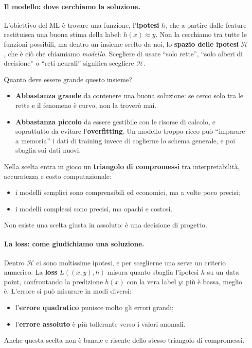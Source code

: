 \paragraph*{Il modello: dove cerchiamo la soluzione.}
L'obiettivo del ML è trovare una funzione, l'\textbf{ipotesi} $h$, che a partire dalle feature restituisca una buona stima della label: $h(x) \approx y$. Non la cerchiamo tra tutte le funzioni possibili, ma dentro un insieme scelto da noi, lo \textbf{spazio delle ipotesi} $\mathcal{H}$, che è ciò che chiamiamo \emph{modello}. Scegliere di usare ``solo rette'', ``solo alberi di decisione'' o ``reti neurali'' significa scegliere $\mathcal{H}$.

Quanto deve essere grande questo insieme?
\begin{itemize}
    \item \textbf{Abbastanza grande} da contenere una buona soluzione: se cerco solo tra le rette e il fenomeno è curvo, non la troverò mai.
    \item \textbf{Abbastanza piccolo} da essere gestibile con le risorse di calcolo, e soprattutto da evitare l'\textbf{overfitting}. Un modello troppo ricco può ``imparare a memoria'' i dati di training invece di coglierne lo schema generale, e poi sbaglia sui dati nuovi.
\end{itemize}
Nella scelta entra in gioco un \textbf{triangolo di compromessi} tra interpretabilità, accuratezza e costo computazionale:
\begin{itemize}
    \item i modelli semplici sono comprensibili ed economici, ma a volte poco precisi;
    \item i modelli complessi sono precisi, ma opachi e costosi.
\end{itemize}
Non esiste una scelta giusta in assoluto: è una decisione di progetto.

\paragraph*{La loss: come giudichiamo una soluzione.}
Dentro $\mathcal{H}$ ci sono moltissime ipotesi, e per sceglierne una serve un criterio numerico. La \textbf{loss} $L((x,y),h)$ misura quanto sbaglia l'ipotesi $h$ su un data point, confrontando la predizione $h(x)$ con la vera label $y$: più è bassa, meglio è. L'errore si può misurare in modi diversi:
\begin{itemize}
    \item l'\textbf{errore quadratico} punisce molto gli errori grandi;
    \item l'\textbf{errore assoluto} è più tollerante verso i valori anomali.
\end{itemize}
Anche questa scelta non è banale e risente dello stesso triangolo di compromessi.


